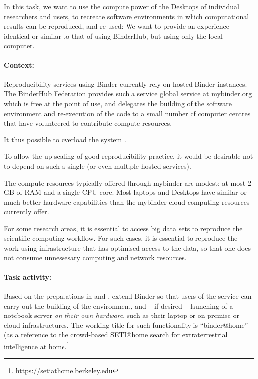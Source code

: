 \begin{task}[
  title=Binder@Home,
  id=binder-at-home,
  lead=SRL,
  PM=7,
  partners={MP,UIO}
]
In this task, we want to use the compute power of the Desktops of individual researchers and
users, to recreate software environments in which computational results can be
reproduced, and re-used: We want to provide an experience identical or similar
to that of using BinderHub, but using only the local computer.

\paragraph*{Context:} Reproducibility services using Binder currently rely on hosted Binder instances.
The BinderHub Federation provides such a service global service at mybinder.org
which is free at
the point of use, and delegates the building of the software environment and
re-execution of the code to a small number of computer centres that have
volunteered to contribute compute resources.

It thus possible to overload the system .

To allow the up-scaling of good reproducibility practice, it would be
desirable not to depend on such a single (or even multiple hosted services).

The compute resources typically offered through mybinder are modest: at most 2 GB of RAM
and a single CPU core.
Most laptops and Desktops have similar or much better hardware capabilities than
the mybinder cloud-computing resources currently offer.

For some research areas, it is essential to access big data sets to reproduce the scientific computing workflow.  For such cases, it is essential to reproduce the work using infrastructure that has optimised access to the data, so that one does not consume unnessesary computing and network resources.  

\paragraph*{Task activity:} Based on the preparations in  and
, extend Binder so that users of the service can
carry out the building of the environment, and -- if desired -- launching of a
notebook server \emph{on their own hardware}, such as their laptop or on-premise or cloud infrastructures.   The working title for such
functionality is ``binder@home'' (as a reference to the crowd-based SETI@home search for
extraterrestrial intelligence at home.\footnote{https://setiathome.berkeley.edu}


\end{task}
